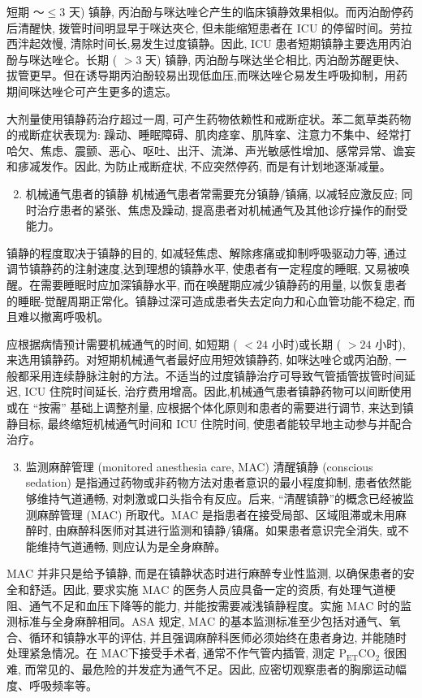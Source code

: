 \documentclass[10pt]{article}
\begin{document}
短期 ～$\leqslant 3$ 天) 镇静, 丙泊酚与咪达唑仑产生的临床镇静效果相似。而丙泊酚停药后清醒快, 拨管时间明显早于咪达夾仑, 但未能缩短患者在 ICU 的停留时间。劳拉西泮起效慢, 清除时间长,易发生过度镇静。因此, ICU 患者短期镇静主要选用丙泊酚与咪达唑仑。长期 ( $>3$ 天) 镇静, 丙泊酚与咪达坐仑相比, 丙泊酚苏醒更快、拔管更早。但在诱导期丙泊酚较易出现低血压,而咪达唑仑易发生呼吸抑制，用药期间咪达唑仑可产生更多的遗忘。

大剂量使用镇静药治疗超过一周, 可产生药物依赖性和戒断症状。苯二氮草类药物的戒断症状表现为: 躁动、睡眠障碍、肌肉痉挛、肌阵挛、注意力不集中、经常打哈欠、焦虑、震颤、恶心、呕吐、出汗、流涕、声光敏感性增加、感常异常、谵妄和㾟㓕发作。因此, 为防止戒断症状, 不应突然停药, 而是有计划地逐渐减量。

\begin{enumerate}
  \setcounter{enumi}{1}
  \item 机械通气患者的镇静 机械通气患者常需要充分镇静/镇痛, 以减轻应激反应; 同时治疗患者的紧张、焦虑及躁动, 提高患者对机械通气及其他诊疗操作的耐受能力。
\end{enumerate}

镇静的程度取决于镇静的目的, 如减轻焦虑、解除疼痛或抑制呼吸驱动力等, 通过调节镇静药的注射速度,达到理想的镇静水平, 使患者有一定程度的睡眠, 又易被唤醒。在需要睡眠时应加深镇静水平, 而在唤醒期应减少镇静药的用量, 以恢复患者的睡眠-觉醒周期正常化。镇静过深可造成患者失去定向力和心血管功能不稳定, 而且难以撤离呼吸机。

应根据病情预计需要机械通气的时间, 如短期 ( $<24$ 小时)或长期 ( $>24$ 小时), 来选用镇静药。对短期机械通气者最好应用短效镇静药, 如咪达唑仑或丙泊酚, 一般都采用连续静脉注射的方法。不适当的过度镇静治疗可导致气管插管拔管时间延迟, ICU 住院时间延长, 治疗费用增高。因此,机械通气患者镇静药物可以间断使用或在 “按需” 基础上调整剂量, 应根据个体化原则和患者的需要进行调节, 来达到镇静目标, 最终缩短机械通气时间和 ICU 住院时间, 使患者能较早地主动参与并配合治疗。

\begin{enumerate}
  \setcounter{enumi}{2}
  \item 监测麻醉管理 (monitored anesthesia care, MAC) 清醒镇静 (conscious sedation) 是指通过药物或非药物方法对患者意识的最小程度抑制, 患者依然能够维持气道通畅, 对刺激或口头指令有反应。后来, “清醒镇静”的概念已经被监测麻醉管理 (MAC) 所取代。MAC 是指患者在接受局部、区域阻滞或未用麻醉时, 由麻醉科医师对其进行监测和镇静/镇痛。如果患者意识完全消失, 或不能维持气道通畅, 则应认为是全身麻醉。
\end{enumerate}

MAC 并非只是给予镇静, 而是在镇静状态时进行麻醉专业性监测, 以确保患者的安全和舒适。因此, 要求实施 MAC 的医务人员应具备一定的资质, 有处理气道梗阻、通气不足和血压下降等的能力, 并能按需要减浅镇静程度。实施 MAC 时的监测标准与全身麻醉相同。ASA 规定, MAC 的基本监测标准至少包括对通气、氧合、循环和镇静水平的评估, 并且强调麻醉科医师必须始终在患者身边, 并能随时处理紧急情况。在 MAC下接受手术者, 通常不作气管内插管, 测定 $\mathrm{P}_{\mathrm{ET}} \mathrm{CO}_{2}$ 很困难, 而常见的、最危险的并发症为通气不足。因此, 应密切观察患者的胸廓运动幅度、呼吸频率等。
\end{document}
